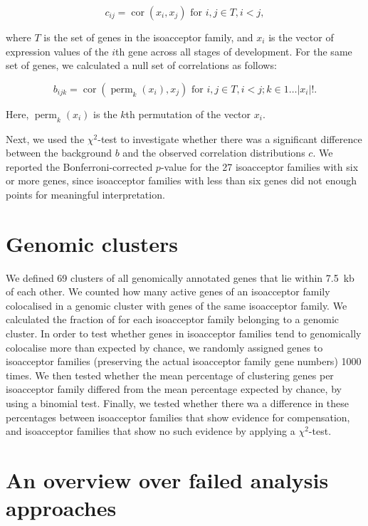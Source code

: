\begin{equation}
    c_{ij} = \operatorname{cor}(x_i, x_j) \text{ for \(i, j \in T, i < j\)},
\end{equation}

where \(T\) is the set of \trna genes in the isoacceptor family, and \(x_i\) is
the vector of expression values of the \(i\)th \trna gene across all stages of
development. For the same set of genes, we calculated a null set of correlations
as follows:

\begin{equation}
    b_{ijk} = \operatorname{cor}(\operatorname{perm}_k(x_i), x_j)
        \text{ for \(i, j \in T, i < j; k \in 1\dots\lvert x_i\rvert!\)}.
\end{equation}

Here, \(\operatorname{perm}_k(x_i)\) is the \(k\)th permutation of the vector
\(x_i\).

Next, we used the \(\chi^2\)-test to investigate whether there was a significant
difference between the background \(b\) and the observed correlation
distributions \(c\). We reported the Bonferroni-corrected \(p\)-value for the
\num{27} isoacceptor families with six or more genes, since isoacceptor families
with less than six genes did not enough points for meaningful interpretation.

\section{Genomic clusters}

We defined \num{69} clusters of all genomically annotated \trna genes that lie
within \SI{7.5}{kb} of each other. We counted how many active \trna genes of an
isoacceptor family colocalised in a genomic cluster with \trna genes of the same
isoacceptor family. We calculated the fraction of \trna for each isoacceptor
family belonging to a genomic cluster. In order to test whether genes in
isoacceptor families tend to genomically colocalise more than expected by
chance, we randomly assigned \trna genes to isoacceptor families (preserving the
actual isoacceptor family gene numbers) \num{1000} times. We then tested whether
the mean percentage of clustering \trna genes per isoacceptor family differed
from the mean percentage expected by chance, by using a binomial test. Finally,
we tested whether there wa a difference in these percentages between isoacceptor
families that show evidence for compensation, and isoacceptor families that show
no such evidence by applying a \(\chi^2\)-test.

\section{An overview over failed analysis approaches}
